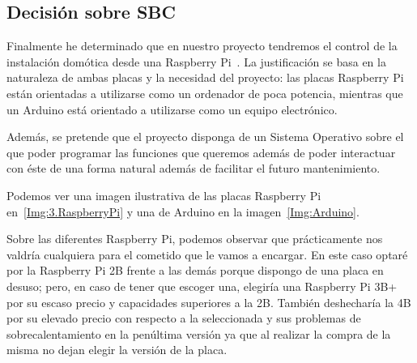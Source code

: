 \subsection{Decisión sobre SBC}\label{4.DecisionSOC}
Finalmente he determinado que en nuestro proyecto tendremos el control de la instalación domótica desde una Raspberry Pi~\cite{misc:RbPWeb}. La justificación se basa en la naturaleza de ambas placas y la necesidad del proyecto: las placas Raspberry Pi están orientadas a utilizarse como un ordenador de poca potencia, mientras que un Arduino está orientado a utilizarse como un equipo electrónico. 

Además, se pretende que el proyecto disponga de un Sistema Operativo sobre el que poder programar las funciones que queremos además de poder interactuar con éste de una forma natural además de facilitar el futuro mantenimiento.

Podemos ver una imagen ilustrativa de las placas Raspberry Pi en~\ref{Img:3.RaspberryPi} y una de Arduino en la imagen~\ref{Img:Arduino}.

Sobre las diferentes Raspberry Pi, podemos observar que prácticamente nos valdría cualquiera para el cometido que le vamos a encargar. En este caso optaré por la Raspberry Pi 2B frente a las demás porque dispongo de una placa en desuso; pero, en caso de tener que escoger una, elegiría una Raspberry Pi 3B+ por su escaso precio y capacidades superiores a la 2B. También deshecharía la 4B por su elevado precio con respecto a la seleccionada y sus problemas de sobrecalentamiento en la penúltima versión ya que al realizar la compra de la misma no dejan elegir la versión de la placa.\\

